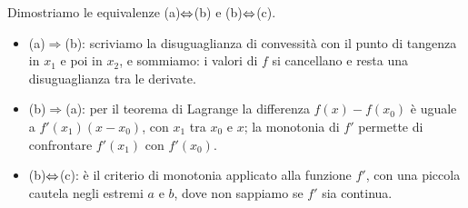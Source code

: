 \begin{schema}
\end{schema}

\begin{strategia}
Dimostriamo le equivalenze (a)$\Leftrightarrow$(b) e (b)$\Leftrightarrow$(c).
\begin{itemize}[nosep]
  \item (a)$\Rightarrow$(b): scriviamo la disuguaglianza di convessità con il punto di
  tangenza in $x_{1}$ e poi in $x_{2}$, e sommiamo: i valori di $f$ si cancellano e resta
  una disuguaglianza tra le derivate.
  \item (b)$\Rightarrow$(a): per il teorema di Lagrange la differenza $f(x)-f(x_{0})$ è
  uguale a $f'(x_{1})(x-x_{0})$, con $x_{1}$ tra $x_{0}$ e $x$; la monotonia di $f'$
  permette di confrontare $f'(x_{1})$ con $f'(x_{0})$.
  \item (b)$\Leftrightarrow$(c): è il criterio di monotonia applicato alla funzione $f'$, con una
  piccola cautela negli estremi $a$ e $b$, dove non sappiamo se $f'$ sia continua.
\end{itemize}
\end{strategia}

